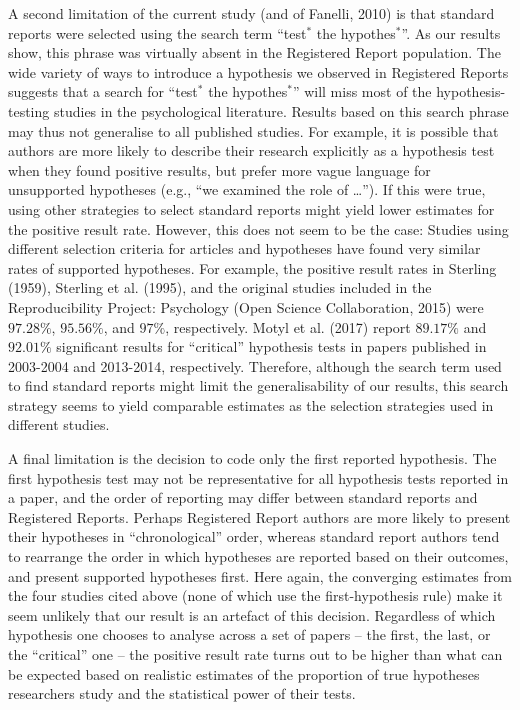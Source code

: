 \documentclass[british,,jou,floatsintext]{apa6}
\begin{document}
A second limitation of the current study (and of Fanelli, 2010) is that standard reports were selected using the search term \enquote{test\(^\ast\) the hypothes\(^\ast\)}.
As our results show, this phrase was virtually absent in the Registered Report population.
The wide variety of ways to introduce a hypothesis we observed in Registered Reports suggests that a search for \enquote{test\(^\ast\) the hypothes\(^\ast\)} will miss most of the hypothesis-testing studies in the psychological literature.
Results based on this search phrase may thus not generalise to all published studies.
For example, it is possible that authors are more likely to describe their research explicitly as a hypothesis test when they found positive results, but prefer more vague language for unsupported hypotheses (e.g., \enquote{we examined the role of \ldots{}}).
If this were true, using other strategies to select standard reports might yield lower estimates for the positive result rate.
However, this does not seem to be the case:
Studies using different selection criteria for articles and hypotheses have found very similar rates of supported hypotheses.
For example, the positive result rates in Sterling (1959), Sterling et al. (1995), and the original studies included in the Reproducibility Project: Psychology (Open Science Collaboration, 2015) were \(97.28\%\), \(95.56\%\), and \(97\%\), respectively.
Motyl et al. (2017) report \(89.17\%\) and \(92.01\%\) significant results for \enquote{critical} hypothesis tests in papers published in 2003-2004 and 2013-2014, respectively.
Therefore, although the search term used to find standard reports might limit the generalisability of our results, this search strategy seems to yield comparable estimates as the selection strategies used in different studies.

A final limitation is the decision to code only the first reported hypothesis.
The first hypothesis test may not be representative for all hypothesis tests reported in a paper, and the order of reporting may differ between standard reports and Registered Reports.
Perhaps Registered Report authors are more likely to present their hypotheses in \enquote{chronological} order, whereas standard report authors tend to rearrange the order in which hypotheses are reported based on their outcomes, and present supported hypotheses first.
Here again, the converging estimates from the four studies cited above (none of which use the first-hypothesis rule) make it seem unlikely that our result is an artefact of this decision.
Regardless of which hypothesis one chooses to analyse across a set of papers -- the first, the last, or the \enquote{critical} one -- the positive result rate turns out to be higher than what can be expected based on realistic estimates of the proportion of true hypotheses researchers study and the statistical power of their tests.
\end{document}
